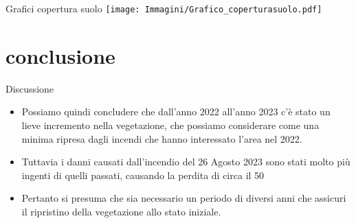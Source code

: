 \documentclass{beamer}
\begin{document}
\begin{frame}{Grafici copertura suolo}
\texttt{[image: Immagini/Grafico\_coperturasuolo.pdf]}
\end{frame}

\section{conclusione}
\begin{frame}{Discussione}
    \begin{itemize}
        \item Possiamo quindi concludere che dall'anno 2022 all'anno 2023 c'è stato un lieve incremento nella vegetazione, che possiamo considerare come una minima ripresa dagli incendi che hanno interessato l'area nel 2022.
        \item Tuttavia i danni causati dall'incendio del 26 Agosto 2023 sono stati molto più ingenti di quelli passati, causando la perdita di circa il 50%
        \item Pertanto si presuma che sia necessario un periodo di diversi anni che assicuri il ripristino della vegetazione allo stato iniziale. 
    \end{itemize}
\end{frame}
\end{document}
